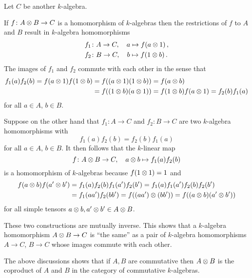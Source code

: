 \begin{fluff}
  \label{fluff: algebra homomorphisms out of tensor product}
  Let $C$ be another $k$-algebra.
  
  If $f \colon A \mathbin{\otimes} B \to C$ is a homomorphism of $k$-algebras then the restrictions of $f$ to $A$ and $B$ result in $k$-algebra homomorphisms
  \begin{align*}
              f_1
    &\colon   A
     \to      C,
     \quad    a
     \mapsto  f(a \mathbin{\otimes} 1) \,,
  \\
              f_2
    &\colon   B
     \to      C,
     \quad    b
     \mapsto  f(1 \mathbin{\otimes} b) \,.
  \end{align*}
  The images of $f_1$ and $f_2$ commute with each other in the sense that
  \begin{align*}
        f_1(a) f_2(b)
     =  f(a \mathbin{\otimes} 1) f(1 \mathbin{\otimes} b)
    &=  f((a \mathbin{\otimes} 1)(1 \mathbin{\otimes} b))
     =  f(a \mathbin{\otimes} b)  \\
    &=  f((1 \mathbin{\otimes} b)(a \mathbin{\otimes} 1))
     =  f(1 \mathbin{\otimes} b) f(a \mathbin{\otimes} 1)
     =  f_2(b) f_1(a)
  \end{align*}
  for all $a \in A$, $b \in B$.
  
  Suppose on the other hand that $f_1 \colon A \to C$ and $f_2 \colon B \to C$ are two $k$-algebra homomorphisms with
  \[
      f_1(a) f_2(b)
    = f_2(b) f_1(a)
  \]
  for all $a \in A$, $b \in B$.
  It then follows that the $k$-linear map
  \[
            f
    \colon  A \mathbin{\otimes} B
    \to     C,
    \quad   a \mathbin{\otimes} b
    \mapsto f_1(a) f_2(b)
  \]
  is a homomorphism of $k$-algebras because $f(1 \mathbin{\otimes} 1) = 1$ and
  \begin{align*}
        f(a \mathbin{\otimes} b) f(a' \mathbin{\otimes} b')
    &=  f_1(a) f_2(b) f_1(a') f_2(b')
     =  f_1(a) f_1(a') f_2(b) f_2(b') \\
    &=  f_1(a a') f_2(b b')
     =  f((a a') \mathbin{\otimes} (b b'))
     =  f((a \mathbin{\otimes} b) (a' \mathbin{\otimes} b'))
  \end{align*}
  for all simple tensors $a \mathbin{\otimes} b, a' \mathbin{\otimes} b' \in A \mathbin{\otimes} B$.
  
  These two constructions are mutually inverse.
  This shows that a $k$-algebra homomorphism $A \mathbin{\otimes} B \to C$ is \enquote{the same} as a pair of $k$-algebra homomorphisms $A \to C$, $B \to C$ whose images commute with each other.
\end{fluff}


\begin{remark}
  The above discussions shows that if $A, B$ are commutative then $A \mathbin{\otimes} B$ is the coproduct of $A$ and $B$ in the category of commutative $k$-algebras.
\end{remark}


